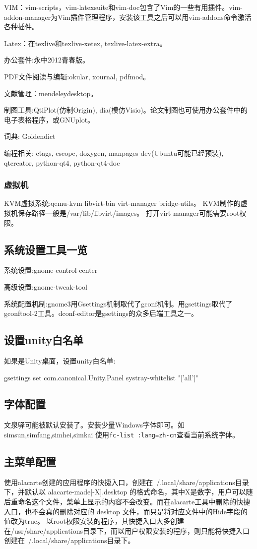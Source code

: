 VIM：vim-scripts，vim-latexsuite和vim-doc包含了Vim的一些有用插件。vim-addon-manager为Vim插件管理程序，安装该工具之后可以用vim-addons命令激活各种插件。

Latex：在texlive和texlive-xetex, texlive-latex-extra。

办公套件:永中2012青春版。

PDF文件阅读与编辑:okular, xournal, pdfmod。 

文献管理：mendeleydesktop。

制图工具:QtiPlot(仿制Origin), dia(模仿Visio)。论文制图也可使用办公套件中的电子表格程序，或GNUplot。 

词典: Goldendict

编程相关: ctags, cscope, doxygen, manpages-dev(Ubuntu可能已经预装), qtcreator, python-qt4, python-qt4-doc

\subsubsection{虚拟机}
KVM虚拟系统:qemu-kvm libvirt-bin virt-manager bridge-utils。
KVM制作的虚拟机保存路径一般是/var/lib/libvirt/images。
打开virt-manager可能需要root权限。


\subsection{系统设置工具一览}

系统设置:gnome-control-center

高级设置:gnome-tweak-tool

系统配置机制:gnome3用Gsettings机制取代了gconf机制。用gsettings取代了gconftool-2工具。dconf-editor是gsettings的众多后端工具之一。

\subsection{设置unity白名单}
如果是Unity桌面，设置unity白名单:
\begin{shellcmd}
gsettings set com.canonical.Unity.Panel systray-whitelist "['all']"
\end{shellcmd}

\subsection{字体配置}
文泉驿可能被默认安装了。安装少量Windows字体即可。如simsun,simfang,simhei,simkai
使用\verb+fc-list :lang=zh-cn+查看当前系统字体。

\subsection{主菜单配置}
使用alacarte创建的应用程序的快捷入口，创建在~/.local/share/applications目录下，并默认以 alacarte-made[-X].desktop 的格式命名，其中X是数字，用户可以随后重命名这个文件，菜单上显示的内容不会改变。而在alacarte工具中删除的快捷入口，也不会真的删除对应的 desktop 文件，而只是将对应文件中的Hide字段的值改为true。
以root权限安装的程序，其快捷入口大多创建在/usr/share/applications目录下，而以用户权限安装的程序，则只能将快捷入口创建在~/.local/share/applications目录下。

